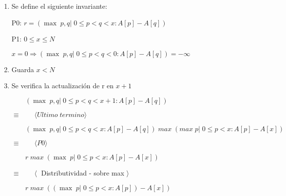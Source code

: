\documentclass[hidelinks]{article}
\begin{document}
\begin{enumerate}
	\item Se define el siguiente invariante: \par
	      \begin{center}
		      P0: $r =(\max \; p,q| \; 0 \leq p < q < x : A[p] - A[q])$ \par
		      P1: $0 \leq x \leq N$ \par
		      $x=0 \Rightarrow (\max \; p,q| \; 0 \leq p < q < 0 : A[p] - A[q])=- \infty$ \par
	      \end{center}
	\item Guarda $x<N$
	\item Se verifica la actualización de r en $x+1$ \par
	      $ \qquad (\max \; p,q| \; 0 \leq p < q < x+1 : A[p] - A[q])$ \par
	      $\equiv  \qquad \langle Ultimo \; termino \rangle$ \par
	      $ \qquad (\max \; p,q| \; 0 \leq p < q < x : A[p] - A[q]) \; max \; (max \; p| \; 0 \leq p < x : A[p] - A[x])$ \par
	      $\equiv  \qquad \langle P0 \rangle$ \par
	      $ \qquad r \; max \; (\max \; p| \; 0 \leq p < x : A[p] - A[x])$ \par
	      $\equiv  \qquad \langle  \;$ Distributividad - sobre max $\rangle$ \par
	      $ \qquad r \; max \; ((\max \; p| \; 0 \leq p < x : A[p]) - A[x])$ \par


\end{enumerate}
\end{document}
